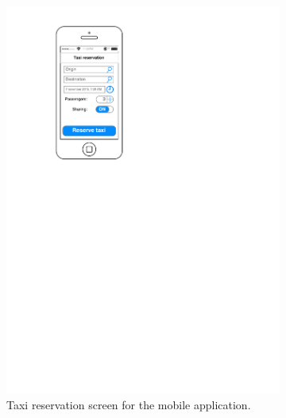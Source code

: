 \begin{figure}[h]
    \centering
    \begin{subfigure}{0.45\textwidth}
        \centering
        \includegraphics[width=\textwidth]{mockup/app/TaxiReservation}
        \caption{Taxi reservation screen for the mobile application.}
        \label{fig:mockup-reservation-mobile}
    \end{subfigure}
    \hspace{1cm}
    \begin{subfigure}{0.45\textwidth}
        \centering

\end{subfigure}
\end{figure}
